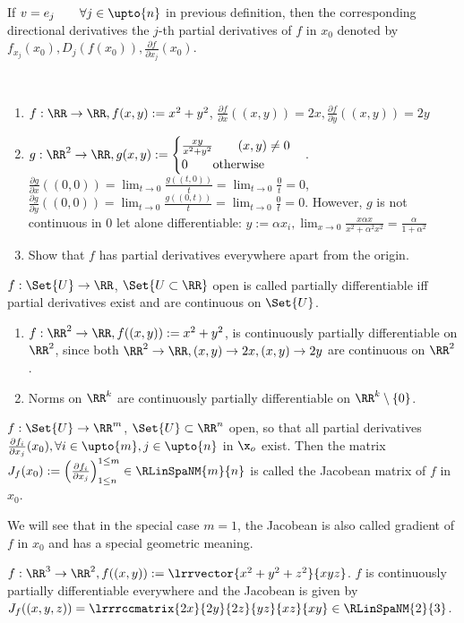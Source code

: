 \begin{defn}
  If $v=e_j\qquad\forall j\in\upto{n}$ in previous definition, then the corresponding directional derivatives the $j$-th partial derivatives of $f$ in $x_0$ denoted by $f_{x_j}(x_0), D_j(f(x_0)), \frac{\partial f}{\partial x_j}(x_0)$. 
\end{defn}
\begin{exam}\ 
  \begin{enumerate}
  	\item $f:\RR\to\RR, f(x,y):=x^2+y^2$, $\frac{\partial f}{\partial x}((x,y))=2x, \frac{\partial f}{\partial y}((x,y))=2y$
  	\item $g:\RR^2\to\RR, g(x,y):=\begin{cases}
  	\frac{xy}{x^2+y^2}\qquad (x,y)\neq 0\\0\qquad\text{otherwise}\end{cases}$. $\frac{\partial g}{\partial x}((0,0))=\lim_{t\to 0}\frac{g((t,0))}{t}=\lim_{t\to 0}\frac{0}{t}=0$, $\frac{\partial g}{\partial y}((0,0))=\lim_{t\to 0}\frac{g((0,t))}{t}=\lim_{t\to 0}\frac{0}{t}=0$. However, $g$ is not continuous in 0 let alone differentiable: $y:=\alpha x_i, \lim_{x\to 0}\frac{x\alpha x}{x^2+\alpha^2x^2}=\frac{\alpha}{1+\alpha^2}$
  	\item Show that $f$ has partial derivatives everywhere apart from the origin. 
  \end{enumerate}
\end{exam}
\begin{defn}
  $f:\Set{U}\to\RR$, $\Set{U\subset\RR}$ open is called partially differentiable iff partial derivatives exist and are continuous on $\Set{U}$. 
\end{defn}
\begin{exam}
  \begin{enumerate}
  	\item $f:\RR^2\to\RR, f((x,y)):=x^2+y^2$, is continuously partially differentiable on $\RR^2$, since both $\RR^2\to \RR, (x,y)\to2x, (x,y)\to2y$ are continuous on $\RR^2$. 
  	\item Norms on $\RR^k$ are continuously partially differentiable on $\RR^k\setminus\{0\}$. 
  \end{enumerate}
\end{exam}
\begin{defn}[Jacobean]
  $f:\Set{U}\to\RR^m$, $\Set{U}\subset\RR^n$ open, so that all partial derivatives $\frac{\partial f_i}{\partial x_j}(x_0), \forall i\in\upto{m}, j\in\upto{n}$ in $\x_o$ exist. Then the matrix $J_f(x_0):=\left(\frac{\partial f_i}{\partial x_j}\right)_{1\leq n}^{1\leq m}\in\RLinSpaNM{m}{n}$ is called the Jacobean matrix of $f$ in $x_0$. 
\end{defn}
\begin{rem}
  We will see that in the special case $m=1$, the Jacobean is also called gradient of $f$ in $x_0$ and has a special geometric meaning. 
\end{rem}
\begin{exam}
  $f:\RR^3\to\RR^2, f((x,y)):=\lrrvector{x^2+y^2+z^2}{xyz}$. $f$ is continuously partially differentiable everywhere and the Jacobean is given by $J_f((x,y,z))=\lrrrccmatrix{2x}{2y}{2z}{yz}{xz}{xy}\in\RLinSpaNM{2}{3}$. 
\end{exam}
